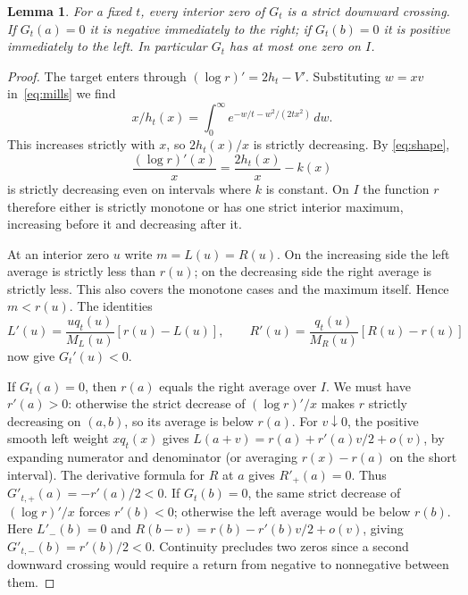 \documentclass[11pt]{article}
\newtheorem{lemma}[theorem]{Lemma}
\begin{document}
\begin{lemma}\label{lem:weight}
For a fixed $t$, every interior zero of $G_t$ is a strict downward crossing.
If $G_t(a)=0$ it is negative immediately to the right; if $G_t(b)=0$ it is
positive immediately to the left. In particular $G_t$ has at most one zero
on $I$.
\end{lemma}
\begin{proof}
The target enters through $(\log r)'=2h_t-V'$. Substituting $w=xv$
in~\eqref{eq:mills} we find
\[
 x/h_t(x)=\int_0^\infty e^{-w/t-w^2/(2tx^2)}\,dw .
\]
This increases strictly with $x$, so $2h_t(x)/x$ is strictly decreasing.
By \eqref{eq:shape},
\[
 \frac{(\log r)'(x)}{x}=\frac{2h_t(x)}{x}-k(x)
\]
is strictly decreasing even on intervals where $k$ is constant.
On $I$ the function $r$ therefore either is strictly monotone or has one
strict interior maximum, increasing before it and decreasing after it.

At an interior zero $u$ write $m=L(u)=R(u)$. On the increasing side the
left average is strictly less than $r(u)$; on the decreasing side the
right average is strictly less. This also covers the monotone cases and the
maximum itself. Hence $m<r(u)$. The identities
\[
 L'(u)=\frac{u q_t(u)}{M_L(u)}[r(u)-L(u)],\qquad
 R'(u)=\frac{q_t(u)}{M_R(u)}[R(u)-r(u)]
\]
now give $G_t'(u)<0$.

If $G_t(a)=0$, then $r(a)$ equals the right average over $I$. We must
have $r'(a)>0$: otherwise the strict decrease of $(\log r)'/x$ makes $r$
strictly decreasing on $(a,b)$, so its average is below $r(a)$.
For $v\downarrow0$, the positive smooth left weight $xq_t(x)$ gives
$L(a+v)=r(a)+r'(a)v/2+o(v)$, by expanding numerator and denominator
(or averaging $r(x)-r(a)$ on the short interval). The derivative formula
for $R$ at $a$ gives $R'_+(a)=0$. Thus $G'_{t,+}(a)=-r'(a)/2<0$.
If $G_t(b)=0$, the same strict decrease of $(\log r)'/x$ forces $r'(b)<0$;
otherwise the left average would be below $r(b)$. Here $L'_-(b)=0$ and
$R(b-v)=r(b)-r'(b)v/2+o(v)$, giving $G'_{t,-}(b)=r'(b)/2<0$.
Continuity precludes two zeros since a second downward crossing would
require a return from negative to nonnegative between them.
\end{proof}
\end{document}
